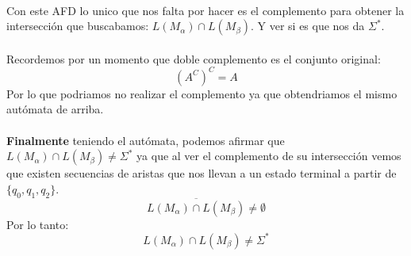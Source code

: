 \\
Con este AFD lo unico que nos falta por hacer es el complemento para obtener la intersección que buscabamos: $L(M_\alpha)\cap L(M_\beta)$. Y ver si es que nos da $\Sigma^*$.
\\{ }\\
 Recordemos por un momento que doble complemento es el conjunto original: $$(A^C)^C=A$$
\noindent
Por lo que podriamos no realizar el complemento ya que obtendriamos el mismo autómata de arriba.
\\{ }\\
\textbf{Finalmente} teniendo el autómata, podemos afirmar que $L(M_\alpha)\cap L(M_\beta)\neq\Sigma^*$ ya que al ver el complemento de su intersección vemos que existen secuencias de aristas que nos llevan a un estado terminal a partir de $\{q_0,q_1,q_2\}$.
$$ \overline{ L(M_\alpha)\cap L(M_\beta)}\neq\emptyset$$
Por lo tanto:
$$ L(M_\alpha)\cap L(M_\beta) \neq \Sigma^* $$